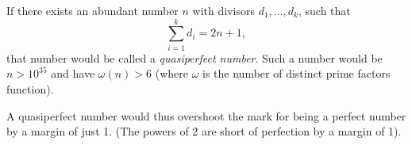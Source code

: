 \documentclass[12pt]{article}
\begin{document}
If there exists an abundant number $n$ with divisors $d_1, \ldots, d_k$, such that $$\sum_{i = 1}^k d_i = 2n + 1,$$ that number would be called a {\em quasiperfect number}. Such a number would be $n > 10^{35}$ and have $\omega(n) > 6$ (where $\omega$ is the number of distinct prime factors function).

A quasiperfect number would thus overshoot the mark for being a perfect number by a margin of just 1. (The powers of 2 are short of perfection by a margin of 1).
\end{document}
